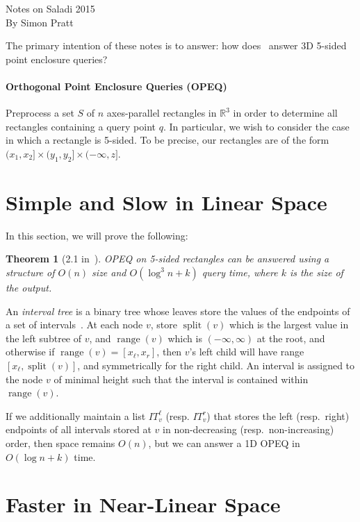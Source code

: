 \documentclass[letterpaper,12pt,twocolumn]{article}
\DeclareMathOperator{\splt}{split}
\DeclareMathOperator{\range}{range}
\newcommand{\BigOh}[1]{O\!\left(#1\right)}
\newcommand\IR{\mathbb{R}}
\newcommand\bounds[1]{(#1]} %
\theoremstyle{plain}
\newtheorem{theorem}{Theorem}
\begin{document}
{\noindent\Large Notes on Saladi 2015}\\
{\noindent\large By Simon Pratt}

The primary intention of these notes is to answer: how
does~\cite{saladi2015improved} answer 3D 5-sided point enclosure
queries?

\paragraph{Orthogonal Point Enclosure Queries (OPEQ)}
Preprocess a set $S$ of $n$ axes-parallel rectangles in $\IR^3$ in
order to determine all rectangles containing a query point $q$.  In
particular, we wish to consider the case in which a rectangle is
5-sided.  To be precise, our rectangles are of the form
$\bounds{x_1,x_2} \times \bounds{y_1, y_2} \times \bounds{-\infty,z}$.

\section{Simple and Slow in Linear Space}

In this section, we will prove the following:

\begin{theorem}[2.1 in~\cite{saladi2015improved}]

  OPEQ on 5-sided rectangles can be answered using a structure of
  $\BigOh{n}$ size and $\BigOh{\log^3 n + k}$ query time, where $k$
  is the size of the output.

\end{theorem}

An \emph{interval tree} is a binary tree whose leaves store the values
of the endpoints of a set of intervals~\cite{edelsbrunner1983new}.  At
each node $v$, store $\splt(v)$ which is the largest value in the left
subtree of $v$, and $\range(v)$ which is $(-\infty,\infty)$ at the
root, and otherwise if $\range(v) = [x_\ell, x_r]$, then $v$'s left
child will have range $[x_\ell, \splt(v)]$, and symmetrically for the
right child.  An interval is assigned to the node $v$ of minimal
height such that the interval is contained within $\range(v)$.

If we additionally maintain a list $IT_v^\ell$ (resp. $IT_v^r$) that
stores the left (resp.\ right) endpoints of all intervals stored at $v$
in non-decreasing (resp.\ non-increasing) order, then space remains
$\BigOh{n}$, but we can answer a 1D OPEQ in $\BigOh{\log n + k}$ time.

\section{Faster in Near-Linear Space}
\end{document}
